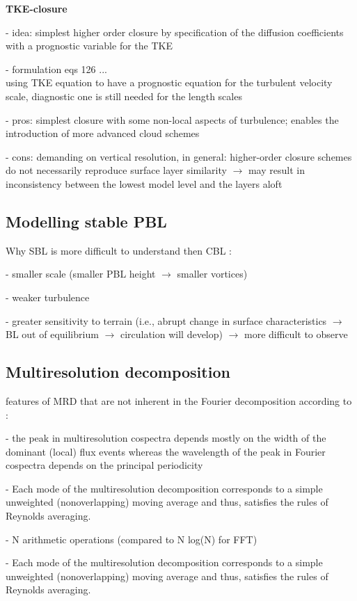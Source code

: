 \documentclass[11pt]{article}
\begin{document}
	\textbf{TKE-closure} 
	\begin{compactenum}
		\item[-] idea: simplest higher order closure by specification of the diffusion coefficients with a prognostic variable for the TKE 
		\item[-] formulation eqs 126 ...\\
		using TKE equation to have a prognostic equation for the turbulent velocity scale, diagnostic one is still needed for the length scales 
		\item[-] pros: simplest closure with some non-local aspects of turbulence; enables the introduction of more advanced cloud schemes
		\item[-] cons: demanding on vertical resolution, in general: higher-order closure schemes do not necessarily reproduce surface layer similarity $\rightarrow$ may result in inconsistency between the lowest model level and the layers aloft
	\end{compactenum}
	
	\subsection{Modelling stable PBL}
	Why SBL is more difficult to understand then CBL \citep{LeMone2019}:
	\begin{compactenum}
		\item[-] smaller scale (smaller PBL height $\rightarrow$ smaller vortices)
		\item[-] weaker turbulence
		\item[-] greater sensitivity to terrain (i.e., abrupt change in surface characteristics $\rightarrow$ BL out of equilibrium $\rightarrow$ circulation will develop) $\rightarrow$ more difficult to observe
	\end{compactenum}
	
	
	
	
	
	\subsection{Multiresolution decomposition}
	features of MRD that are not inherent in the Fourier decomposition according to \citet{Howell1997}:
	\begin{compactenum}
		\item[-] the peak in multiresolution cospectra depends
		mostly on the width of the dominant (local) flux events whereas the wavelength
		of the peak in Fourier cospectra depends on the principal periodicity
		\item[-] Each mode of the multiresolution decomposition corresponds to a simple unweighted (nonoverlapping) moving average and thus, satisfies the rules of
		Reynolds averaging.
		\item[-] N arithmetic operations (compared to N log(N) for FFT)
		\item[-] Each mode of the multiresolution decomposition corresponds to a simple unweighted (nonoverlapping) moving average and thus, satisfies the rules of
		Reynolds averaging.
	\end{compactenum}
	
\end{document}
